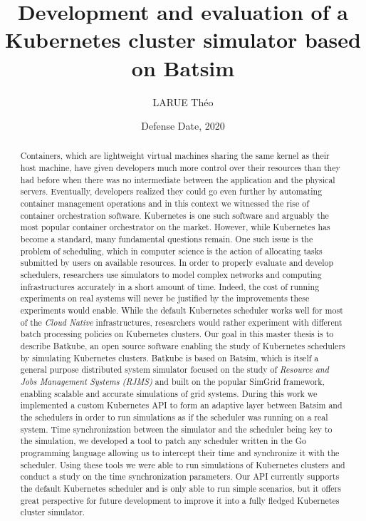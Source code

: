 \documentclass[12pt, a4paper]{memoir}
\title{Development and evaluation of a Kubernetes cluster simulator based on
Batsim}
\author{LARUE Théo}
\date{Defense Date, 2020} %
\begin{document}
\frontmatter
\begin{titlingpage}
\maketitle
\end{titlingpage}

\setlength{\parskip}{-1pt plus 1pt}

\renewcommand{\abstracttextfont}{\normalfont}
\abstractintoc
\begin{abstract} 
	Containers, which are lightweight virtual machines sharing the same
	kernel as their host machine, have given developers much more control
	over their resources than they had before when there was no
	intermediate between the application and the physical servers.
	Eventually, developers realized they could go even further by
	automating container management operations and in this context we
	witnessed the rise of container orchestration software. Kubernetes is
	one such software and arguably the most popular container orchestrator
	on the market.  However, while Kubernetes has become a standard, many
	fundamental questions remain. One such issue is the problem of
	scheduling, which in computer science is the action of allocating tasks
	submitted by users on available resources.  In order to properly
	evaluate and develop schedulers, researchers use simulators to model
	complex networks and computing infrastructures accurately in a short
	amount of time. Indeed, the cost of running experiments on real systems
	will never be justified by the improvements these experiments would
	enable.  While the default Kubernetes scheduler works well for most of
	the \textit{Cloud Native} infrastructures, researchers would rather
	experiment with different batch processing policies on Kubernetes
	clusters.  Our goal in this master thesis is to describe Batkube, an
	open source software enabling the study of Kubernetes schedulers by
	simulating Kubernetes clusters. Batkube is based on Batsim, which is
	itself a general purpose distributed system simulator focused on the
	study of \textit{Resource and Jobs Management Systems (RJMS)} and built
	on the popular SimGrid framework, enabling scalable and accurate
	simulations of grid systems. During this work we implemented a custom
	Kubernetes API to form an adaptive layer between Batsim and the
	schedulers in order to run simulations as if the scheduler was running
	on a real system. Time synchronization between the simulator and the
	scheduler being key to the simulation, we developed a tool to patch any
	scheduler written in the Go programming language allowing us to
	intercept their time and synchronize it with the scheduler. Using these
	tools we were able to run simulations of Kubernetes clusters and
	conduct a study on the time synchronization parameters. Our API
	currently supports the default Kubernetes scheduler and is only able to
	run simple scenarios, but it offers great perspective for future
	development to improve it into a fully fledged Kubernetes cluster
	simulator.
\end{abstract}
\abstractintoc
\end{document}
